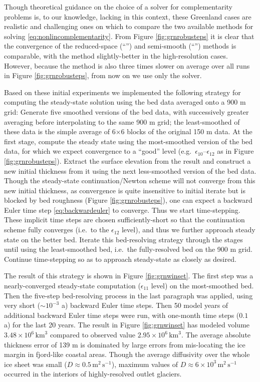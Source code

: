 \documentclass[twocolumn,a4paper]{igs}
\newcommand\eps{\epsilon}
\begin{document}
Though theoretical guidance on the choice of a solver for complementarity problems is, to our knowledge, lacking in this context, these Greenland cases are realistic and challenging ones on which to compare the two available methods for solving \eqref{eq:nonlincomplementarity}.  From Figure \ref{fig:grnrobusteps} it is clear that the convergence of the reduced-space (``\virs'') and semi-smooth (``\viss'') methods is comparable, with the \virs method slightly-better in the high-resolution cases.  However, because the \viss method is also three times slower on average over all runs in Figure \ref{fig:grnrobusteps}, from now on we use only the \virs solver.

Based on these initial experiments we implemented the following strategy for computing the steady-state solution using the \MCB bed data averaged onto a 900 m grid:  Generate five smoothed versions of the bed data, with successively greater averaging before interpolating to the same 900 m grid; the least-smoothed of these data is the simple average of 6$\times$6 blocks of the original 150 m data.  At the first stage, compute the steady state using the most-smoothed version of the bed data, for which we expect convergence to a ``good'' level (e.g.~$\eps_{10}$--$\eps_{12}$ as in Figure \ref{fig:grnrobusteps}).  Extract the surface elevation from the result and construct a new initial thickness from it using the next less-smoothed version of the bed data.  Though the steady-state continuation/Newton scheme will not converge from this new initial thickness, as convergence is quite insensitive to initial iterate but is blocked by bed roughness (Figure \ref{fig:grnrobusteps}), one can expect a backward Euler time step \eqref{eq:backwardeuler} to converge.  Thus we start time-stepping.  These implicit time steps are chosen sufficiently-short so that the continuation scheme fully converges (i.e.~to the $\eps_{12}$ level), and thus we further approach steady state on the better bed.  Iterate this bed-resolving strategy through the stages until using the least-smoothed bed, i.e.~the fully-resolved bed on the 900 m grid.  Continue time-stepping so as to approach steady-state as closely as desired.

The result of this strategy is shown in Figure \ref{fig:grnwinset}.  The first step was a nearly-converged steady-state computation ($\eps_{11}$ level) on the most-smoothed bed.  Then the five-step bed-resolving process in the last paragraph was applied, using very short ($\sim10^{-3}$ a) backward Euler time steps.  Then 50 model years of additional backward Euler time steps were run, with one-month time steps ($0.1$ a) for the last 20 years.  The result in Figure \ref{fig:grnwinset} has modeled volume $3.48\times 10^6\,\text{km}^3$ compared to observed value $2.95\times 10^6\,\text{km}^3$.  The average absolute thickness error of 139 m is dominated by large errors from mis-locating the ice margin in fjord-like coastal areas.  Though the average diffusivity over the whole ice sheet was small ($D\approx 0.5\,\text{m}^2\,\text{s}^{-1}$), maximum values of $D\approx 6\times 10^3\,\text{m}^2\,\text{s}^{-1}$ occurred in the interiors of highly-resolved outlet glaciers.
\end{document}
